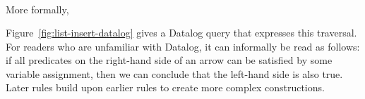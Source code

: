 \begin{figure*}
\begin{align*}

\end{align*}
\caption{Datalog rules for an ordered list (insertion only).}\label{fig:list-insert-datalog}
\end{figure*}

More formally, 

Figure~\ref{fig:list-insert-datalog} gives a Datalog query that expresses this traversal.
For readers who are unfamiliar with Datalog, it can informally be read as follows: if all predicates on the right-hand side of an arrow can be satisfied by some variable assignment, then we can conclude that the left-hand side is also true.
Later rules build upon earlier rules to create more complex constructions.
